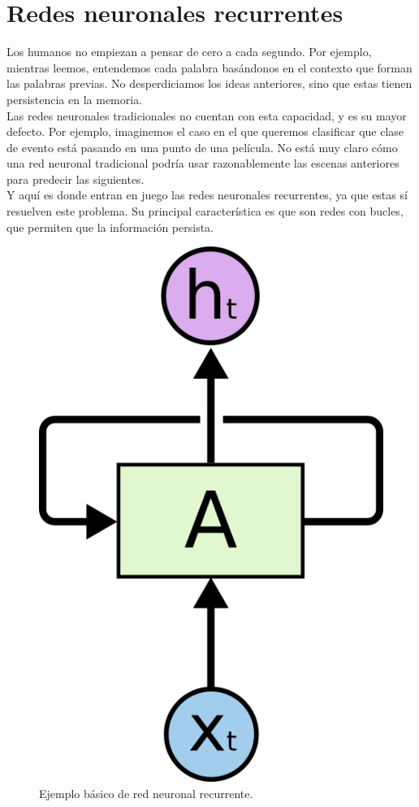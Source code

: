 \section{Redes neuronales recurrentes}
Los humanos no empiezan a pensar de cero a cada segundo. Por ejemplo, mientras leemos, entendemos cada palabra basándonos en el contexto que forman las palabras previas. No desperdiciamos los ideas anteriores, sino que estas tienen persistencia en la memoria.\\
Las redes neuronales tradicionales no cuentan con esta capacidad, y es su mayor defecto. Por ejemplo, imaginemos el caso en el que queremos clasificar que clase de evento está pasando en una punto de una película. No está muy claro cómo una red neuronal tradicional podría usar razonablemente las escenas anteriores para predecir las siguientes.\\
Y aquí es donde entran en juego las redes neuronales recurrentes, ya que estas sí resuelven este problema. Su principal característica es que son redes con bucles, que permiten que la información persista.\\
\begin{figure}[htp]
\centering
\vspace{-1.5em}
\includegraphics[scale=0.3]{images/rnnrolled.png}
\caption{Ejemplo básico de red neuronal recurrente.}
\end{figure}

